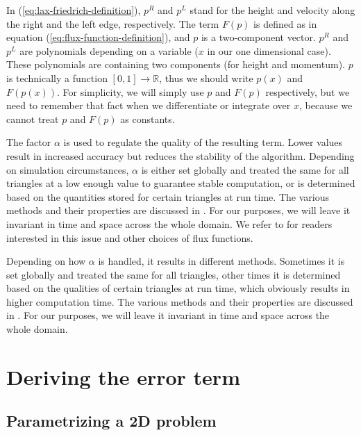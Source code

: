 \documentclass[a4paper, twoside]{article}
\newcommand{\reals}{\mathbb{R}}
\begin{document}
In (\ref{eq:lax-friedrich-definition}), $p^R$ and $p^L$ stand for the height and velocity along the right and the left edge, respectively. The term $F(p)$ is defined as in equation (\ref{eq:flux-function-definition}), and $p$ is a two-component vector. $p^R$ and $p^L$ are polynomials depending on a variable ($x$ in our one dimensional case). These polynomials are containing two components (for height and momentum). $p$ is technically a function $[0,1]\rightarrow\reals$, thus we should write $p\left(x\right)$ and $F\left(p\left(x\right)\right)$. For simplicity, we will simply use $p$ and $F\left(p\right)$ respectively, but we need to remember that fact when we differentiate or integrate over $x$, because we cannot treat $p$ and $F\left(p\right)$ as constants.

The factor $\alpha$ is used to regulate the quality of the resulting term.
Lower values result in increased accuracy but reduces the stability of the algorithm.
Depending on simulation circumstances, $\alpha$ is either set globally and treated the same for all triangles at a low enough value to guarantee stable computation, or is determined based on the quantities stored for certain triangles at run time.
The various methods and their properties are discussed in \cite{leveque2002finite}.
For our purposes, we will leave it invariant in time and space across the whole domain.
We refer to \cite{cockburn1999discontinuous,leveque2002finite} for readers interested in this issue and other choices of flux functions.

Depending on how $\alpha$ is handled, it results in different methods. Sometimes it is set globally and treated the same for all triangles, other times it is determined based on the qualities of certain triangles at run time, which obviously results in higher computation time. The various methods and their properties are discussed in \cite{leveque2002finite}. For our purposes, we will leave it invariant in time and space across the whole domain.

\section{Deriving the error term}
\label{sec:deriving-error-term-i}

\subsection{Parametrizing a 2D problem}
\label{sec:original-situation-2D problem}
\end{document}

